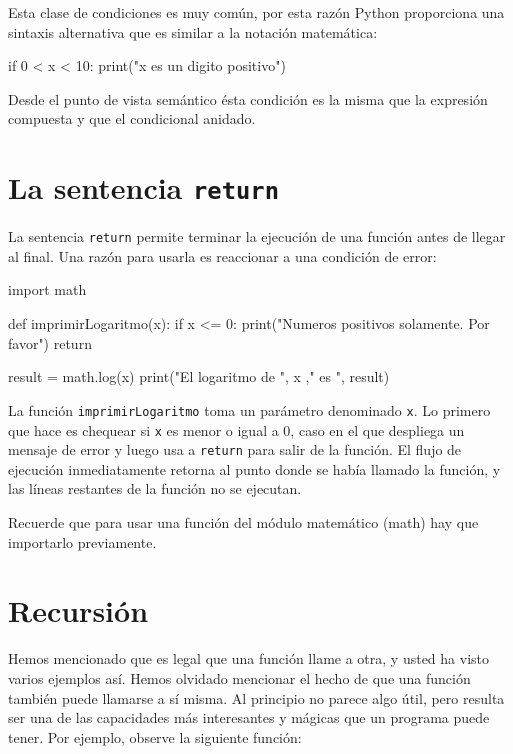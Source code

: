 Esta clase de condiciones es muy común, por esta razón Python proporciona
una sintaxis alternativa que es similar a la notación matemática:
\begin{pythoncode}
if 0 < x < 10:
  print("x es un digito positivo")
\end{pythoncode}

Desde el punto de vista semántico ésta condición es la misma que la
expresión compuesta y que el condicional anidado.

\section{La sentencia \texttt{return} }

 

La sentencia \texttt{return} permite terminar la ejecución de una
función antes de llegar al final. Una razón para usarla es reaccionar
a una condición de error:

\begin{pythoncode}
import math

def imprimirLogaritmo(x):
  if x <= 0:
    print("Numeros positivos solamente. Por favor")
    return

  result = math.log(x)
  print("El logaritmo de ",  x ," es ", result)
\end{pythoncode}
 La función \texttt{imprimirLogaritmo} toma un parámetro denominado
\texttt{x}. Lo primero que hace es chequear si \texttt{x} es menor
o igual a 0, caso en el que despliega un mensaje de error y luego
usa a \texttt{return} para salir de la función. El flujo de ejecución
inmediatamente retorna al punto donde se había llamado la función,
y las líneas restantes de la función no se ejecutan.

Recuerde que para usar una función del módulo matemático (math) hay
que importarlo previamente.

\section{Recursión}

\label{recursion} 

Hemos mencionado que es legal que una función llame a otra, y usted
ha visto varios ejemplos así. Hemos olvidado mencionar el hecho de
que una función también puede llamarse a sí misma. Al principio no
parece algo útil, pero resulta ser una de las capacidades más interesantes
y mágicas que un programa puede tener. Por ejemplo, observe la siguiente
función:

